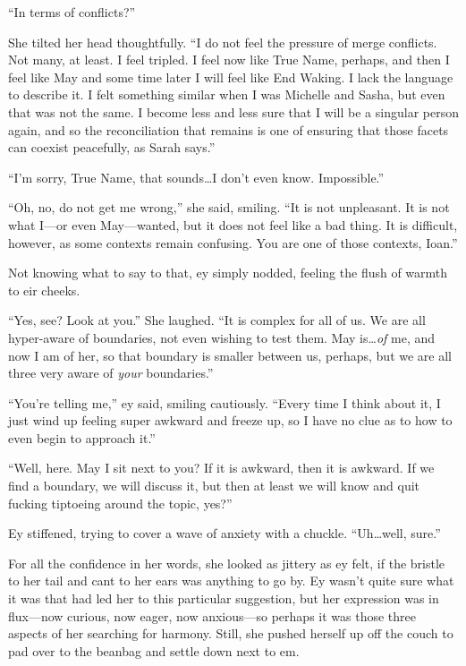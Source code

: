 ``In terms of conflicts?''

She tilted her head thoughtfully. ``I do not feel the pressure of merge conflicts. Not many, at least. I feel tripled. I feel now like True Name, perhaps, and then I feel like May and some time later I will feel like End Waking. I lack the language to describe it. I felt something similar when I was Michelle and Sasha, but even that was not the same. I become less and less sure that I will be a singular person again, and so the reconciliation that remains is one of ensuring that those facets can coexist peacefully, as Sarah says.''

``I'm sorry, True Name, that sounds\ldots I don't even know. Impossible.''

``Oh, no, do not get me wrong,'' she said, smiling. ``It is not unpleasant. It is not what I—or even May—wanted, but it does not feel like a bad thing. It is difficult, however, as some contexts remain confusing. You are one of those contexts, Ioan.''

Not knowing what to say to that, ey simply nodded, feeling the flush of warmth to eir cheeks.

``Yes, see? Look at you.'' She laughed. ``It is complex for all of us. We are all hyper-aware of boundaries, not even wishing to test them. May is\ldots{}\emph{of} me, and now I am of her, so that boundary is smaller between us, perhaps, but we are all three very aware of \emph{your} boundaries.''

``You're telling me,'' ey said, smiling cautiously. ``Every time I think about it, I just wind up feeling super awkward and freeze up, so I have no clue as to how to even begin to approach it.''

\protect\hypertarget{cuddle}{}{}``Well, here. May I sit next to you? If it is awkward, then it is awkward. If we find a boundary, we will discuss it, but then at least we will know and quit fucking tiptoeing around the topic, yes?''

Ey stiffened, trying to cover a wave of anxiety with a chuckle. ``Uh\ldots well, sure.''

For all the confidence in her words, she looked as jittery as ey felt, if the bristle to her tail and cant to her ears was anything to go by. Ey wasn't quite sure what it was that had led her to this particular suggestion, but her expression was in flux—now curious, now eager, now anxious—so perhaps it was those three aspects of her searching for harmony. Still, she pushed herself up off the couch to pad over to the beanbag and settle down next to em.

